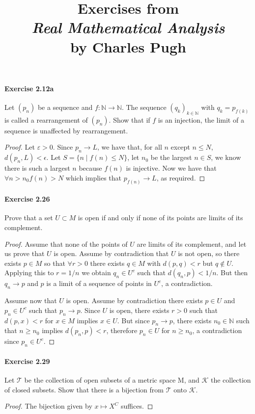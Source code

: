 \documentclass{article}
\title{\textbf{
Exercises from \\
\textit{Real Mathematical Analysis} \\
by Charles Pugh
}}
\date{}
\begin{document}
\maketitle



\paragraph{Exercise 2.12a} Let $(p_n)$ be a sequence and $f:\mathbb{N}\to\mathbb{N}$. The sequence $(q_k)_{k\in\mathbb{N}}$ with $q_k=p_{f(k)}$ is called a rearrangement of $(p_n)$. Show that if $f$ is an injection, the limit of a sequence is unaffected by rearrangement.
\begin{proof}
    Let $\varepsilon>0$. Since $p_n \rightarrow L$, we have that, for all $n$ except $n \leq N$, $d\left(p_n, L\right)<\epsilon$. Let $S=\{n \mid f(n) \leq N\}$, let $n_0$ be the largest $n \in S$, we know there is such a largest $n$ because $f(n)$ is injective. Now we have that $\forall n>n_0 f(n)>N$ which implies that $p_{f(n)} \rightarrow L$, as required.
\end{proof}


\paragraph{Exercise 2.26} Prove that a set $U \subset M$ is open if and only if none of its points are limits of its complement.
\begin{proof}
    Assume that none of the points of $U$ are limits of its complement, and let us prove that $U$ is open. Assume by contradiction that $U$ is not open, so there exists $p \in M$ so that $\forall r>0$ there exists $q \in M$ with $d(p, q)<r$ but $q \notin U$. Applying this to $r=1 / n$ we obtain $q_n \in U^c$ such that $d\left(q_n, p\right)<1 / n$. But then $q_n \rightarrow p$ and $p$ is a limit of a sequence of points in $U^c$, a contradiction.

Assume now that $U$ is open. Assume by contradiction there exists $p \in U$ and $p_n \in U^c$ such that $p_n \rightarrow p$. Since $U$ is open, there exists $r>0$ such that $d(p, x)<r$ for $x \in M$ implies $x \in U$. But since $p_n \rightarrow p$, there exists $n_0 \in \mathbb{N}$ such that $n \geq n_0$ implies $d\left(p_n, p\right)<r$, therefore $p_n \in U$ for $n \geq n_0$, a contradiction since $p_n \in U^c$.
\end{proof}



\paragraph{Exercise 2.29} Let $\mathcal{T}$ be the collection of open subsets of a metric space $\mathrm{M}$, and $\mathcal{K}$ the collection of closed subsets. Show that there is a bijection from $\mathcal{T}$ onto $\mathcal{K}$.
\begin{proof}
   The bijection given by $x\mapsto X^C$ suffices.  
\end{proof}
\end{document}
